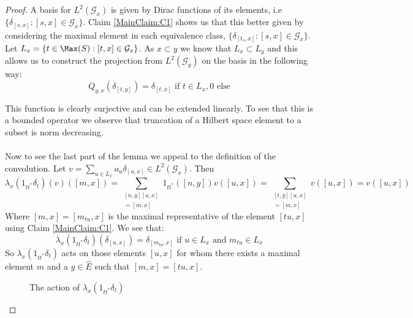 \begin{proof}
A basis for $L^{2}(\mathcal{G}_{x})$ is given by Dirac functions of its elements, i.e $\lbrace \delta_{[s,x]} : [s,x] \in \mathcal{G}_{x} \rbrace$. Claim \ref{MainClaim:C1} shows us that this better given by considering the maximal element in each equivalence class, $\lbrace \delta_{[t_{s},x]} : [s,x] \in \mathcal{G}_{x} \rbrace$. Let $L_{x} = \lbrace t \in \Max(S) : [t,x] \in \mathcal{G}_{x} \rbrace$. As $x \subset y$ we know that $L_{x} \subset L_{y}$ and this  allows us to construct the projection from $L^{2}(\mathcal{G}_{y})$ on the basis in the following way:
\begin{equation}
Q_{y,x}(\delta_{[t,y]})=\delta_{[t,x]} \mbox{ if } t \in L_{x}, 0 \mbox{ else}  
\end{equation}

This function is clearly surjective and can be extended linearly. To see that this is a bounded operator we observe that truncation of a Hilbert space element to a subset is norm decreasing.\\
\\
Now to see the last part of the lemma we appeal to the definition of the convolution. Let $v = \sum_{u \in L_{x}} a_{u}\delta_{[u,x]} \in L^{2}(\mathcal{G}_{x})$. Then
\begin{equation*}
\lambda_{x}(1_{tt^{*}}\delta_{t})(v)([m,x])=\sum_{\substack{[n,y][u,x]\\=[m,x]}} 1_{tt^{*}}([n,y])v([u,x])=\sum_{\substack{[t,y][u,x]\\=[m,x]}}v([u,x])=v([u,x])
\end{equation*}
Where $[m,x]=[m_{tu},x]$ is the maximal representative of the element $[tu,x]$ using Claim \ref{MainClaim:C1}. We see that:
\begin{equation*}
\lambda_{x}(1_{tt^{*}}\delta_{t})(\delta_{[u,x]})= \delta_{[m_{tu},x]} \mbox{ if } u\in L_{x} \mbox{ and } m_{tu} \in L_{x}
\end{equation*}
So $\lambda_{x}(1_{tt^{*}}\delta_{t})$ acts on those elements $[u,x]$ for whom there exists a maximal element $m$ and a $y \in \widehat{E}$ such that $[m,x]=[tu,x]$. 

\begin{figure}\label{fig:F1}





\caption{The action of $\lambda_{x}(1_{tt^{*}}\delta_{t})$}


\end{figure}
\end{proof}
